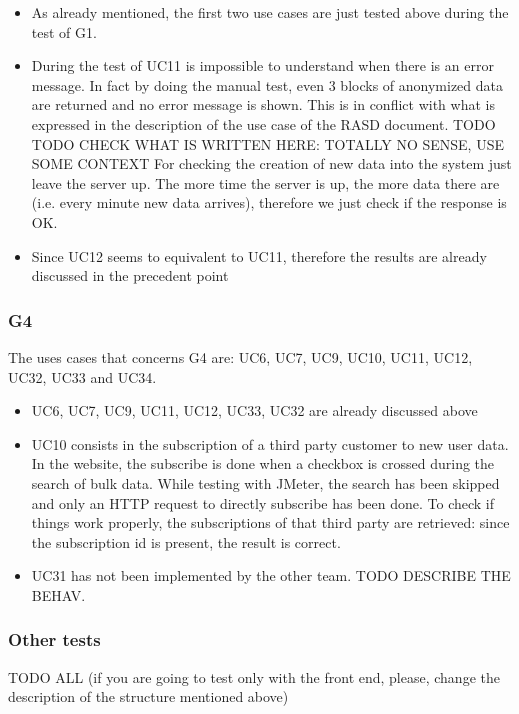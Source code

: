 \begin{itemize}
\item 
As already mentioned, the first two use cases are just tested above during the test of G1.

\item 
During the test of UC11 is impossible to understand when there is an error message. 
In fact by doing the manual test, even 3 blocks of anonymized data are returned and no error message is shown. 
This is in conflict with what is expressed in the description of the use case of the RASD document. TODO \\

TODO CHECK WHAT IS WRITTEN HERE: TOTALLY NO SENSE, USE SOME CONTEXT
For checking the creation of new data into the system just leave the server up. 
The more time the server is up, the more
data there are (i.e. every minute new data arrives), therefore we just check if the response is OK.

\item Since UC12 seems to equivalent to UC11, therefore the results are already discussed in the precedent point

\end{itemize}

\subsubsection{G4}
The uses cases that concerns G4 are: UC6, UC7, UC9, UC10, UC11, UC12, UC32, UC33 and UC34. \\

\begin{itemize}
\item 
UC6, UC7, UC9, UC11, UC12, UC33, UC32 are already discussed above

\item 
UC10 consists in the subscription of a third party customer to new user data. \\
In the website, the subscribe is done when a checkbox is crossed during the search of bulk data. 
While testing with JMeter, the search has been skipped and only an HTTP request to directly subscribe has been done.
To check if things work properly, the subscriptions of that third party are retrieved: since the subscription id is present, the
result is correct.

\item UC31 has not been implemented by the other team. TODO DESCRIBE THE BEHAV.

\end{itemize}

\subsubsection{Other tests}
TODO ALL (if you are going to test only with the front end, please, change the description of the structure mentioned above) 